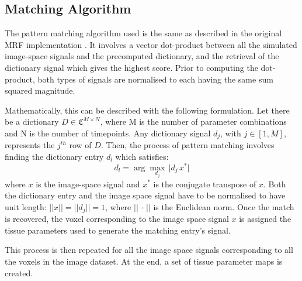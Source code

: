 
\hfill

\subsection{Matching Algorithm}
\label{method:matching}

The pattern matching algorithm used is the same as described in the original MRF implementation \cite{Ma2013}.
It involves a vector dot-product between all the simulated image-space signals and the precomputed dictionary, and the retrieval of the dictionary signal which gives the highest score.
Prior to computing the dot-product, both types of signals are normalised to each having the same sum squared magnitude.

\hfill

Mathematically, this can be described with the following formulation.
Let there be a dictionary $D \in \mathfrak{C}^{M \times N}$, where M is the number of parameter combinations and N is the number of timepoints.
Any dictionary signal $d_j$, with $j \in [1,M]$, represents the $j^{th}$ row of $D$.
Then, the process of pattern matching involves finding the dictionary entry $d_l$ which satisfies:
\begin{equation}
    d_l = \arg\!\max_{d_j} \, \lvert d_j \, x^* \rvert
\end{equation}
where $x$ is the image-space signal and $x^*$ is the conjugate transpose of $x$.
Both the dictionary entry and the image space signal have to be normalised to have unit length: $\lvert \lvert x \rvert \rvert = \lvert \lvert d_j \rvert \rvert = 1$, where $\lvert \lvert \, \cdot \, \rvert \rvert$ is the Euclidean norm.
Once the match is recovered, the voxel corresponding to the image space signal $x$ is assigned the tissue parameters used to generate the matching entry's signal.

\hfill

This process is then repeated for all the image space signals corresponding to all the voxels in the image dataset.
At the end, a set of tissue parameter maps is created.